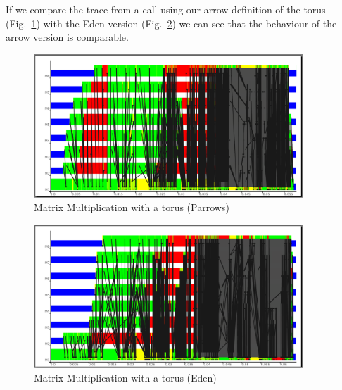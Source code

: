 If we compare the trace from a call using our arrow definition of the torus (Fig.~\ref{fig:torus_parrows_trace}) with the Eden version (Fig.~\ref{fig:torus_eden_trace}) we can see that the behaviour of the arrow version is comparable.
\begin{figure}[ht]
	\centering
	\includegraphics[width=0.9\textwidth]{images/torus_matrix_parrows_scale}
	\caption[Matrix Multiplication with a torus (Parrows)]{Matrix Multiplication with a torus (Parrows)}
	\label{fig:torus_parrows_trace}
\end{figure}

\begin{figure}[ht]
	\centering
	\includegraphics[width=0.9\textwidth]{images/torus_matrix_eden_scale}
	\caption[Matrix Multiplication with a torus (Eden)]{Matrix Multiplication with a torus (Eden)}
	\label{fig:torus_eden_trace}
\end{figure}



